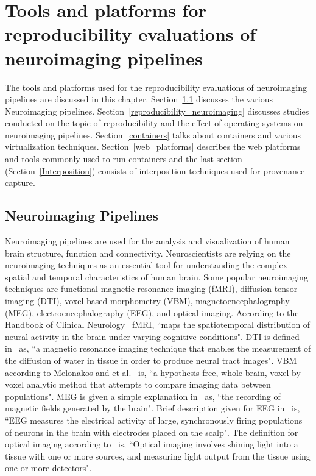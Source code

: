 \chapter{Tools and platforms for reproducibility evaluations of neuroimaging pipelines}\label{toolsandplatforms}

The tools and platforms used for the reproducibility evaluations of neuroimaging pipelines are discussed in this chapter.
Section~\ref{neuroimaging} discusses the various Neuroimaging pipelines. Section~\ref{reproducibility_neuroimaging} discusses studies conducted on the topic of reproducibility and the effect of operating systems on neuroimaging pipelines. Section~\ref{containers} talks about containers and various virtualization techniques. Section~\ref{web_platforms} describes the web platforms and tools commonly used to run containers and the last section (Section~\ref{Interposition}) consists of interposition techniques used for provenance capture.

\section{Neuroimaging Pipelines}\label{neuroimaging}
Neuroimaging pipelines are used for the analysis and visualization of human brain structure, function and connectivity. Neuroscientists are relying on the neuroimaging techniques as an essential tool for understanding the complex spatial and temporal characteristics of human brain. Some popular neuroimaging techniques are functional magnetic resonance imaging (fMRI), diffusion tensor imaging (DTI), voxel based morphometry (VBM), magnetoencephalography (MEG), electroencephalography (EEG), and optical imaging. According  to the Handbook of Clinical Neurology~\cite{BUCHBINDER201661} fMRI, ``maps the spatiotemporal distribution of neural activity in the brain under varying cognitive conditions". DTI is defined in~\cite{Rizea11} as, ``a magnetic resonance imaging technique that enables the measurement of the diffusion of water in tissue in order to produce neural tract images". VBM according to Melonakos and et al.~\cite{MELONAKOS201165} is, ``a hypothesis-free, whole-brain, voxel-by-voxel analytic method that attempts to compare imaging data between populations". MEG is given a simple explanation in~\cite{Sato1985} as, ``the recording of magnetic fields generated by the brain". Brief description given for EEG in~\cite{Light2010} is, ``EEG measures the electrical activity of large, synchronously firing populations of neurons in the brain with electrodes placed on the scalp". The definition for optical imaging according to~\cite{doi:10.1080/23273798.2017.1290810} is, ``Optical imaging involves shining light into a tissue with one or more sources, and measuring light output from the tissue using one or more detectors".

